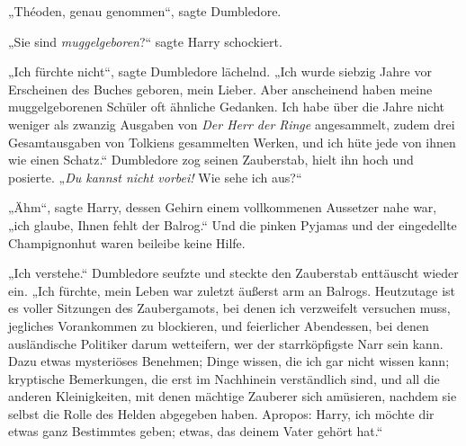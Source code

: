 „Théoden, genau genommen“, sagte Dumbledore.

„Sie sind \emph{muggelgeboren}?“ sagte Harry schockiert.

„Ich fürchte nicht“, sagte Dumbledore lächelnd.
„Ich wurde siebzig Jahre vor Erscheinen des Buches geboren, mein Lieber. Aber anscheinend haben meine muggelgeborenen Schüler oft ähnliche Gedanken. Ich habe über die Jahre nicht weniger als zwanzig Ausgaben von \emph{Der Herr der Ringe} angesammelt, zudem drei Gesamtausgaben von Tolkiens gesammelten Werken, und ich hüte jede von ihnen wie einen Schatz.“ Dumbledore zog seinen Zauberstab, hielt ihn hoch und posierte.
„\emph{Du kannst nicht vorbei!} Wie sehe ich aus?“

„Ähm“, sagte Harry, dessen Gehirn einem vollkommenen Aussetzer nahe war, „ich glaube, Ihnen fehlt der Balrog.“ Und die pinken Pyjamas und der eingedellte Champignonhut waren beileibe keine Hilfe.

„Ich verstehe.“ Dumbledore seufzte und steckte den Zauberstab enttäuscht wieder ein.
„Ich fürchte, mein Leben war zuletzt äußerst arm an Balrogs. Heutzutage ist es voller Sitzungen des Zaubergamots, bei denen ich verzweifelt versuchen muss, jegliches Vorankommen zu blockieren, und feierlicher Abendessen, bei denen ausländische Politiker darum wetteifern, wer der starrköpfigste Narr sein kann. Dazu etwas mysteriöses Benehmen; Dinge wissen, die ich gar nicht wissen kann; kryptische Bemerkungen, die erst im Nachhinein verständlich sind, und all die anderen Kleinigkeiten, mit denen mächtige Zauberer sich amüsieren, nachdem sie selbst die Rolle des Helden abgegeben haben. Apropos: Harry, ich möchte dir etwas ganz Bestimmtes geben; etwas, das deinem Vater gehört hat.“

